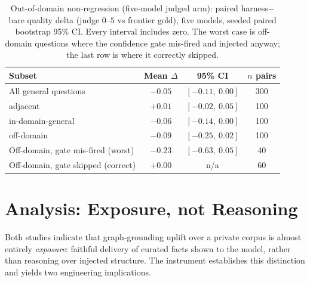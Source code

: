 \documentclass[10pt,twocolumn]{article}
\begin{document}
\begin{table}[t]\centering\small
\caption{Out-of-domain non-regression (five-model judged arm): paired harness$-$bare quality delta (judge
$0$--$5$ vs frontier gold), five models, seeded paired bootstrap 95\% CI. Every interval includes
zero. The worst case is off-domain questions where the confidence gate mis-fired and injected anyway;
the last row is where it correctly skipped.}
\label{tab:ood}
\begin{tabular}{lccc}
\toprule
Subset & Mean $\Delta$ & 95\% CI & $n$ pairs \\
\midrule
All general questions              & $-0.05$ & $[-0.11,\ 0.00]$ & 300 \\
\quad adjacent                     & $+0.01$ & $[-0.02,\ 0.05]$ & 100 \\
\quad in-domain-general            & $-0.06$ & $[-0.14,\ 0.00]$ & 100 \\
\quad off-domain                   & $-0.09$ & $[-0.25,\ 0.02]$ & 100 \\
Off-domain, gate mis-fired (worst) & $-0.23$ & $[-0.63,\ 0.05]$ & 40 \\
Off-domain, gate skipped (correct) & $+0.00$ & n/a              & 60 \\
\bottomrule
\end{tabular}
\end{table}


\section{Analysis: Exposure, not Reasoning}\label{sec:analysis}
Both studies indicate that graph-grounding uplift over a private corpus is almost entirely \emph{exposure}: faithful delivery of curated facts shown to the model, rather than reasoning over injected structure. The instrument establishes this distinction and yields two engineering implications.
\end{document}

